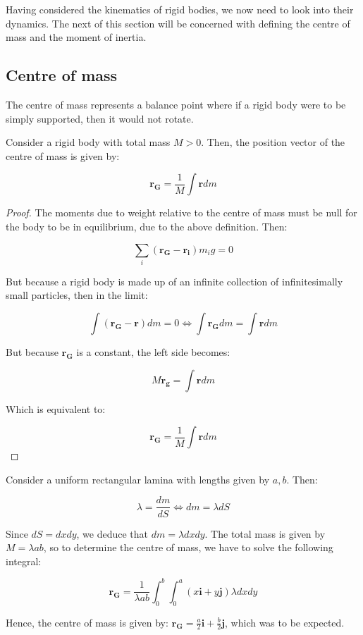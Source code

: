 \documentclass[12pt]{article}
\begin{document}
Having considered the kinematics of rigid bodies, we now need to look into their dynamics. The next of this section will be concerned with defining the centre of mass and the moment of inertia.

\subsection{Centre of mass}

\begin{definition}
    The centre of mass represents a balance point where if a rigid body were to be simply supported, then it would not rotate.
\end{definition}

\begin{theorem}
    Consider a rigid body with total mass $M > 0$. Then, the position vector of the centre of mass is given by:

    \[ \mathbf{r_G} = \frac{1}{M}\int\mathbf{r}dm \]
\end{theorem}

\begin{proof}
    The moments due to weight relative to the centre of mass must be null for the body to be in equilibrium, due to the above definition. Then:

    \[ \sum_i \left(\mathbf{r_G} - \mathbf{r_i}\right)m_ig = 0 \]

    But because a rigid body is made up of an infinite collection of infinitesimally small particles, then in the limit:

    \[ \int(\mathbf{r_G} - \mathbf{r})dm = 0 \Leftrightarrow \int \mathbf{r_G}dm = \int \mathbf{r}dm\]

    But because $\mathbf{r_G}$ is a constant, the left side becomes:

    \[ M\mathbf{r_g} = \int \mathbf{r}dm \]

    Which is equivalent to:

    \[ \mathbf{r_G} = \frac{1}{M} \int \mathbf{r}dm \]
\end{proof}

\begin{example}
    Consider a uniform rectangular lamina with lengths given by $a, b$. Then:

    \[ \lambda = \frac{dm}{dS} \Leftrightarrow dm = \lambda dS \]

    Since $dS = dx dy$, we deduce that $dm = \lambda dx dy$. The total mass is given by $M = \lambda ab$, so to determine the centre of mass, we have to solve the following integral:

    \[ \mathbf{r_G} = \frac{1}{\lambda ab} \int_0^b\int_0^a\left(x\mathbf{i} + y\mathbf{j}\right)\lambda dx dy \]

    Hence, the centre of mass is given by: $\mathbf{r_G} = \frac{a}{2}\mathbf{i} + \frac{b}{2}\mathbf{j}$, which was to be expected.
\end{example}
\end{document}
